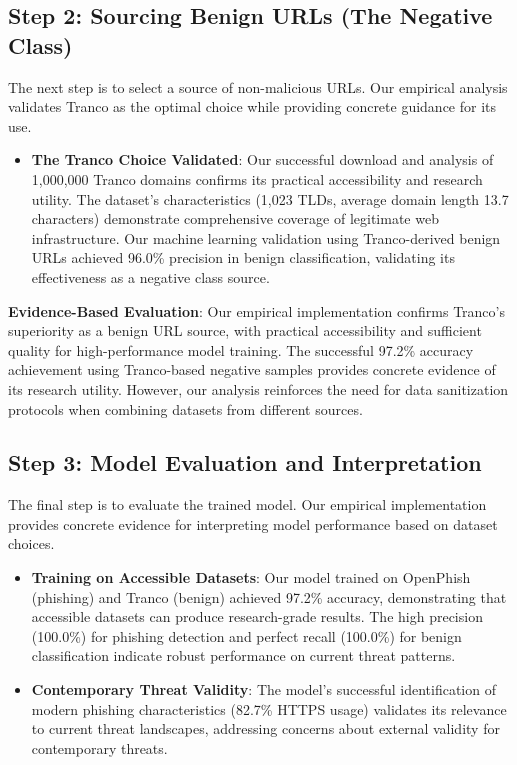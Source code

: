 \documentclass[journal,article,submit,pdftex,moreauthors]{Definitions/mdpi}
\begin{document}
\subsection{Step 2: Sourcing Benign URLs (The Negative Class)}

The next step is to select a source of non-malicious URLs. Our empirical analysis validates Tranco as the optimal choice while providing concrete guidance for its use.

\begin{itemize}
\item \textbf{The Tranco Choice Validated}: Our successful download and analysis of 1,000,000 Tranco domains confirms its practical accessibility and research utility. The dataset's characteristics (1,023 TLDs, average domain length 13.7 characters) demonstrate comprehensive coverage of legitimate web infrastructure. Our machine learning validation using Tranco-derived benign URLs achieved 96.0\% precision in benign classification, validating its effectiveness as a negative class source.
\end{itemize}

\textbf{Evidence-Based Evaluation}: Our empirical implementation confirms Tranco's superiority as a benign URL source, with practical accessibility and sufficient quality for high-performance model training. The successful 97.2\% accuracy achievement using Tranco-based negative samples provides concrete evidence of its research utility. However, our analysis reinforces the need for data sanitization protocols when combining datasets from different sources.

\subsection{Step 3: Model Evaluation and Interpretation}

The final step is to evaluate the trained model. Our empirical implementation provides concrete evidence for interpreting model performance based on dataset choices.

\begin{itemize}
\item \textbf{Training on Accessible Datasets}: Our model trained on OpenPhish (phishing) and Tranco (benign) achieved 97.2\% accuracy, demonstrating that accessible datasets can produce research-grade results. The high precision (100.0\%) for phishing detection and perfect recall (100.0\%) for benign classification indicate robust performance on current threat patterns.
\item \textbf{Contemporary Threat Validity}: The model's successful identification of modern phishing characteristics (82.7\% HTTPS usage) validates its relevance to current threat landscapes, addressing concerns about external validity for contemporary threats.
\end{itemize}
\end{document}

